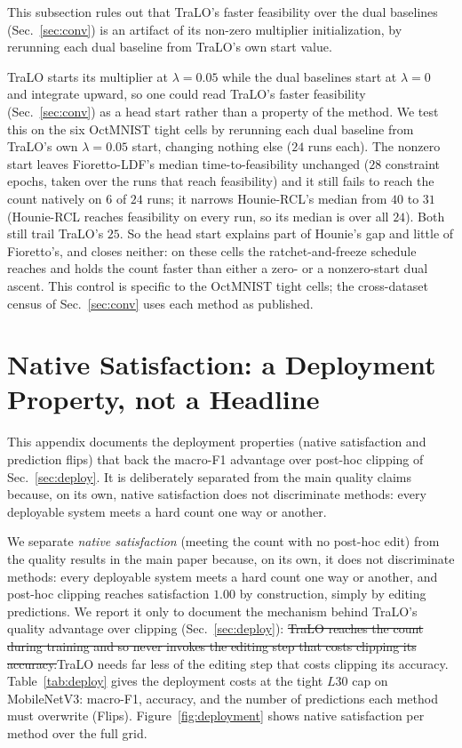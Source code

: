 \documentclass[10pt]{article}
\newcommand{\del}[1]{{\color{red}\sout{#1}}}
\begin{document}
This subsection rules out that TraLO's faster feasibility over the dual
baselines (Sec.~\ref{sec:conv}) is an artifact of its non-zero multiplier
initialization, by rerunning each dual baseline from TraLO's own start
value.

TraLO starts its multiplier at $\lambda{=}0.05$ while the dual
baselines start at $\lambda{=}0$ and integrate upward, so one could
read TraLO's faster feasibility (Sec.~\ref{sec:conv}) as a head start
rather than a property of the method. We test this on the six OctMNIST
tight cells by rerunning each dual baseline from TraLO's own
$\lambda{=}0.05$ start, changing nothing else ($24$ runs each). The
nonzero start leaves Fioretto-LDF's median time-to-feasibility
unchanged ($28$ constraint epochs, taken over the runs that reach
feasibility) and it still fails to reach the count natively on $6$ of
$24$ runs; it narrows Hounie-RCL's median from $40$ to $31$
(Hounie-RCL reaches feasibility on every run, so its median is over
all $24$). Both still trail TraLO's $25$. So the head start explains
part of Hounie's gap and little of Fioretto's, and closes neither: on
these cells the ratchet-and-freeze schedule reaches and holds the
count faster than either a zero- or a nonzero-start dual ascent. This
control is specific to the OctMNIST tight cells; the cross-dataset
census of Sec.~\ref{sec:conv} uses each method as published.



\section{Native Satisfaction: a Deployment Property, not a Headline}
\label{app:deploy}

This appendix documents the deployment properties (native satisfaction
and prediction flips) that back the macro-F1 advantage over post-hoc
clipping of Sec.~\ref{sec:deploy}. It is deliberately separated from the
main quality claims because, on its own, native satisfaction does not
discriminate methods: every deployable system meets a hard count one
way or another.



We separate \emph{native satisfaction} (meeting the count with no
post-hoc edit) from the quality results in the main paper because, on
its own, it does not discriminate methods: every deployable system meets
a hard count one way or another, and post-hoc clipping reaches
satisfaction $1.00$ by construction, simply by editing predictions. We
report it only to document the mechanism behind TraLO's quality
advantage over clipping (Sec.~\ref{sec:deploy}): \del{TraLO reaches the
count during training and so never invokes the editing step that costs
clipping its accuracy.}{\color{blue}TraLO needs far less of the editing
step that costs clipping its accuracy.} Table~\ref{tab:deploy} gives the deployment costs
at the tight $L30$ cap on MobileNetV3: macro-F1, accuracy, and the
number of predictions each method must overwrite (Flips).
Figure~\ref{fig:deployment} shows native satisfaction per method over
the full grid.
\end{document}
